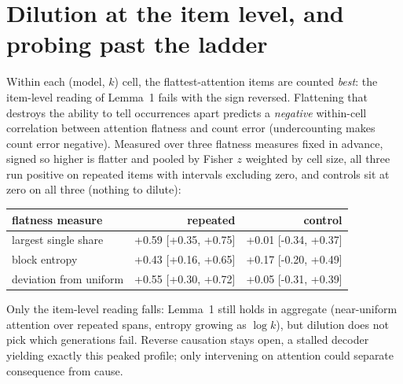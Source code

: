 \section{Dilution at the item level, and probing past the ladder}
\label{sec:dilution}

Within each (model, $k$) cell, the flattest-attention items are counted
\emph{best}: the item-level reading of Lemma~1 fails with the sign
reversed. Flattening that destroys the ability to tell occurrences
apart predicts a \emph{negative} within-cell correlation between
attention flatness and count error (undercounting makes count error
negative). Measured over three flatness measures fixed in advance,
signed so higher is flatter and pooled by Fisher $z$ weighted by cell
size, all three run positive on repeated items with intervals excluding
zero, and controls sit at zero on all three (nothing to dilute):
\begin{center}
\begin{tabular}{lrr}
\toprule
flatness measure & repeated & control \\
\midrule
largest single share   & +0.59 [+0.35, +0.75] & +0.01 [-0.34, +0.37] \\
block entropy          & +0.43 [+0.16, +0.65] & +0.17 [-0.20, +0.49] \\
deviation from uniform & +0.55 [+0.30, +0.72] & +0.05 [-0.31, +0.39] \\
\bottomrule
\end{tabular}
\end{center}
Only the item-level reading falls: Lemma~1 still holds in aggregate
(near-uniform attention over repeated spans, entropy growing as
$\log k$), but dilution does not pick which generations fail. Reverse
causation stays open, a stalled decoder yielding exactly this peaked
profile; only intervening on attention could separate consequence from
cause.


